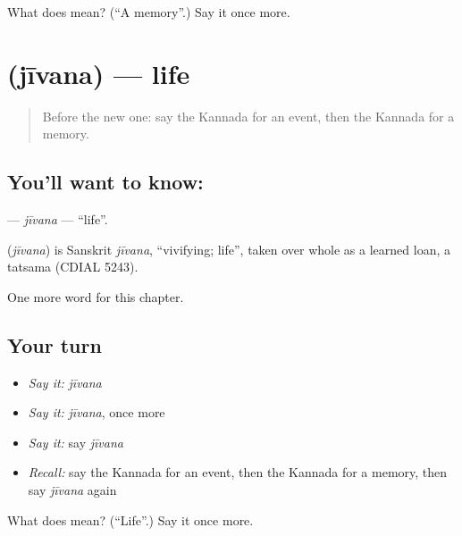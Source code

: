 \begin{tcolorbox}[breakable,colback=teal!4,colframe=teal!35!black,title={Before you move on}]
What does  mean? (\textquotedblleft{}A memory\textquotedblright{}.) Say it once more.
\end{tcolorbox}
\section[\texorpdfstring{\kn{ಜೀವನ} (jīvana)}{ಜೀವನ (jīvana)}]{ (jīvana) — life}

\label{lesson:KA-C253-jivana}



\begin{quote}
Before the new one: say the Kannada for an event, then the Kannada for a memory.
\end{quote}

\subsection*{You'll want to know: }
\textbf{} — \emph{jīvana} — \textquotedblleft{}life\textquotedblright{}.

\begin{cousinweb}
\textbf{} (\emph{jīvana}) is Sanskrit \emph{jīvana}, \textquotedblleft{}vivifying; life\textquotedblright{}, taken over whole as a learned loan, a tatsama (CDIAL 5243).
\end{cousinweb}

\begin{grammarlens}[title={What you've built}]
One more word for this chapter.
\end{grammarlens}

\subsection*{Your turn}
\begin{itemize}
\raggedright
  \item \emph{Say it:} \emph{jīvana}
  \item \emph{Say it:} \emph{jīvana}, once more
  \item \emph{Say it:} say \emph{jīvana}
  \item \emph{Recall:} say the Kannada for an event, then the Kannada for a memory, then say \emph{jīvana} again
\end{itemize}

\begin{tcolorbox}[breakable,colback=teal!4,colframe=teal!35!black,title={Before you move on}]
What does  mean? (\textquotedblleft{}Life\textquotedblright{}.) Say it once more.
\end{tcolorbox}
